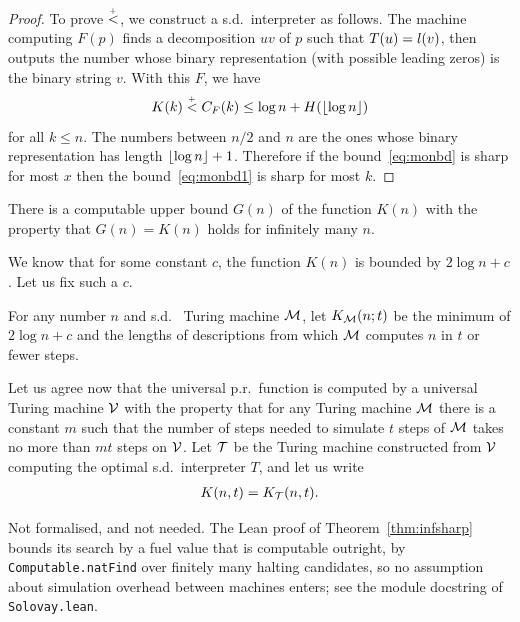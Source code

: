 \begin{proof}
  \leanok
 To prove $\stackrel{{}_+}{<}$, we construct a s.d.~interpreter as follows.
  The machine computing $F(p)$ finds a decomposition $uv$ of $p$ such that
$T(u)=l(v)$, then outputs the number whose binary representation (with
possible leading zeros) is the binary string $v$.
  With this $F$, we have
 \begin{equation} \label{eq:monbd1}   
   K(k) \stackrel{{}_+}{<} C_{F}(k) \le \log n + H ({\lfloor  \log n \rfloor}) 
 \end{equation}
  for all $k \le n$.
 The numbers between $n/2$ and $n$ are the ones whose binary representation
has length ${\lfloor  \log n\rfloor} + 1$.
  Therefore if the bound~\eqref{eq:monbd} is sharp for most $x$ then the 
bound~\eqref{eq:monbd1} is sharp for most $k$.
 \end{proof}

\begin{theorem}
  \leanok
   \label{thm:infsharp} 
  There is a computable upper bound $G(n)$ of the function $K(n)$ with the
property that $G(n)=K(n)$ holds for infinitely many $n$.
 \end{theorem}

 \begin{definition}
  \label{def:K-with-time}
  \leanok
We know that for some constant $c$, the
function $K(n)$ is bounded by $2\log n + c$.
Let us fix such a $c$.

For any number $n$ and s.d.~ Turing machine $\mathcal{M}$, let $K_{\mathcal{M}}(n;t)$ be
the minimum of $2\log n + c$ and the lengths of descriptions from which
$\mathcal{M}$ computes $n$ in $t$ or fewer steps.
 \end{definition}

 \begin{definition}
  \label{def:universal-machine-V}
Let us agree now that the universal p.r.~function
is computed by a universal Turing
machine $\mathcal{V}$ with the property that for any Turing machine $\mathcal{M}$ there is
a constant $m$ such that the number of steps needed to simulate $t$ steps
of $\mathcal{M}$ takes no more than $mt$ steps on $\mathcal{V}$.
Let $\mathcal{T}$ be the Turing machine constructed from $\mathcal{V}$ computing the
optimal s.d.~interpreter $T$, and let us write 
 \begin{align*}
  K(n,t)=K_{\mathcal{T}}(n,t).
 \end{align*}
 \end{definition}
\begin{formalization}
Not formalised, and not needed. The Lean proof of Theorem~\ref{thm:infsharp} bounds its search by a fuel value that is computable outright, by \texttt{Computable.natFind} over finitely many halting candidates, so no assumption about simulation overhead between machines enters; see the module docstring of \texttt{Solovay.lean}.
\end{formalization}


